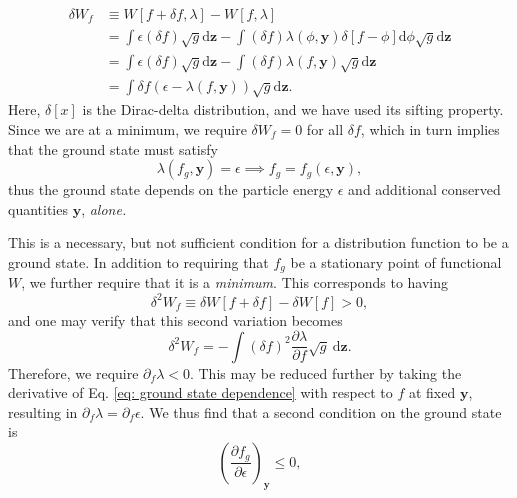\begin{equation*}
\begin{aligned}
    \delta W_f &\equiv W[f+ \delta f,\lambda]-W[f,\lambda] \\
    &= \int \epsilon (\delta f) \sqrt{g} \mathrm{d} \boldsymbol{z} - \int (\delta f) \lambda(\phi,\boldsymbol{y}) \delta[f - \phi] \mathrm{d} \phi \sqrt{g} \mathrm{d} \boldsymbol{z}  \\
    &= \int \epsilon (\delta f) \sqrt{g} \mathrm{d} \boldsymbol{z} - \int(\delta f) \lambda(f,\boldsymbol{y}) \sqrt{g} \mathrm{d} \boldsymbol{z} \\
    &= \int \delta f \left( \epsilon - \lambda(f,\boldsymbol{y}) \right) \sqrt{g} \mathrm{d} \boldsymbol{z}.
\end{aligned}
\end{equation*}
Here, $\delta[x]$ is the Dirac-delta distribution, and we have used its sifting property. Since we are at a minimum, we require $\delta W_f=0$ for all $\delta f$, which in turn implies that the ground state must satisfy
\begin{equation}
     \lambda(f_g,\boldsymbol{y})=\epsilon \implies f_g = f_g(\epsilon,\boldsymbol{y}),
     \label{eq: ground state dependence}
\end{equation}
thus the ground state depends on the particle energy $\epsilon$ and additional conserved quantities $\boldsymbol{y}$, \textit{alone.} \par
This is a necessary, but not sufficient condition for a distribution function to be a ground state. In addition to requiring that $f_g$ be a stationary point of functional $W$, we further require that it is a \textit{minimum}. This corresponds to having
\begin{equation}
    \delta^2 W_f \equiv \delta W[f+ \delta f] - \delta W[f] > 0,
\end{equation}
and one may verify that this second variation becomes
\begin{equation}
    \delta^2 W_f = - \int (\delta f)^2 \frac{\partial \lambda}{\partial f} \sqrt{g} \: \mathrm{d} \boldsymbol{z}.
\end{equation}
Therefore, we require $\partial_f \lambda < 0$. This may be reduced further by taking the derivative of Eq. \eqref{eq: ground state dependence} with respect to $f$ at fixed $\boldsymbol{y}$, resulting in $\partial_f \lambda = \partial_f \epsilon$. We thus find that a second condition on the ground state is
\begin{equation}
     \left(\frac{\partial f_g}{\partial \epsilon} \right)_{\boldsymbol{y}} \leq 0,
\end{equation}

